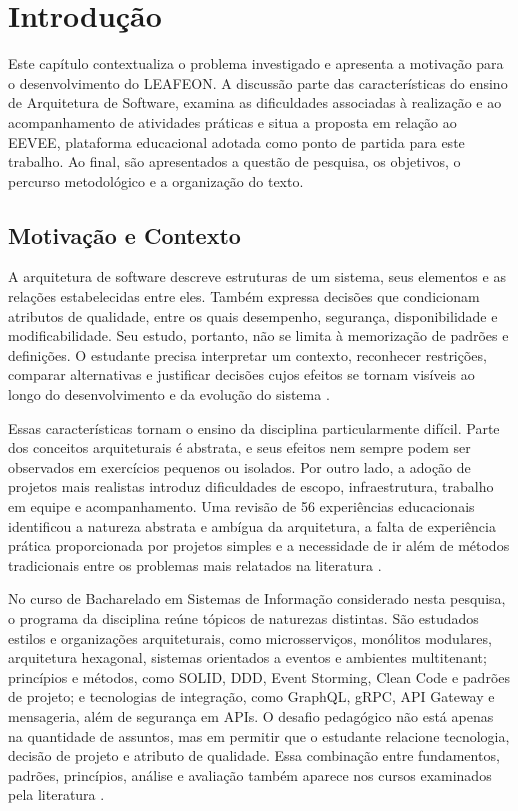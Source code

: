 \chapter{Introdução}
\label{sec:introducao}

Este capítulo contextualiza o problema investigado e apresenta a motivação para
o desenvolvimento do LEAFEON. A discussão parte das características do ensino
de Arquitetura de Software, examina as dificuldades associadas à realização e
ao acompanhamento de atividades práticas e situa a proposta em relação ao
EEVEE, plataforma educacional adotada como ponto de partida para este trabalho.
Ao final, são apresentados a questão de pesquisa, os objetivos, o percurso
metodológico e a organização do texto.

\section{Motivação e Contexto}
\label{sec:motivacao-contexto}

A arquitetura de software descreve estruturas de um sistema, seus elementos e
as relações estabelecidas entre eles. Também expressa decisões que condicionam
atributos de qualidade, entre os quais desempenho, segurança, disponibilidade e
modificabilidade. Seu estudo, portanto, não se limita à memorização de padrões e
definições. O estudante precisa interpretar um contexto, reconhecer restrições,
comparar alternativas e justificar decisões cujos efeitos se tornam visíveis ao
longo do desenvolvimento e da evolução do sistema
\cite{bass_software_2012,pantoja_training_2024}.

Essas características tornam o ensino da disciplina particularmente difícil.
Parte dos conceitos arquiteturais é abstrata, e seus efeitos nem sempre podem
ser observados em exercícios pequenos ou isolados. Por outro lado, a adoção de
projetos mais realistas introduz dificuldades de escopo, infraestrutura,
trabalho em equipe e acompanhamento. Uma revisão de 56 experiências
educacionais identificou a natureza abstrata e ambígua da arquitetura, a falta
de experiência prática proporcionada por projetos simples e a necessidade de
ir além de métodos tradicionais entre os problemas mais relatados na literatura
\cite{galster_teaching_2016,pantoja_training_2024}.

No curso de Bacharelado em Sistemas de Informação considerado nesta pesquisa,
o programa da disciplina reúne tópicos de naturezas distintas. São estudados
estilos e organizações arquiteturais, como microsserviços, monólitos modulares,
arquitetura hexagonal, sistemas orientados a eventos e ambientes multitenant;
princípios e métodos, como SOLID, DDD, Event Storming, Clean Code e padrões de
projeto; e tecnologias de integração, como GraphQL, gRPC, API Gateway e
mensageria, além de segurança em APIs. O desafio pedagógico não está apenas na
quantidade de assuntos, mas em permitir que o estudante relacione tecnologia,
decisão de projeto e atributo de qualidade. Essa combinação entre fundamentos,
padrões, princípios, análise e avaliação também aparece nos cursos examinados
pela literatura \cite{pantoja_training_2024}.

